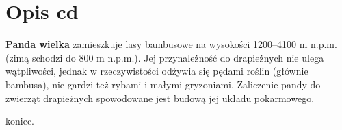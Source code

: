\section*{Opis cd}
{\bf Panda wielka} zamieszkuje lasy bambusowe na wysokości 1200–4100 m n.p.m. (zimą schodzi do 800 m n.p.m.). Jej przynależność do drapieżnych nie ulega wątpliwości, jednak w rzeczywistości odżywia się pędami roślin (głównie bambusa), nie gardzi też rybami i małymi gryzoniami. Zaliczenie pandy do zwierząt drapieżnych spowodowane jest budową jej układu pokarmowego.

\vspace{2em}
koniec.